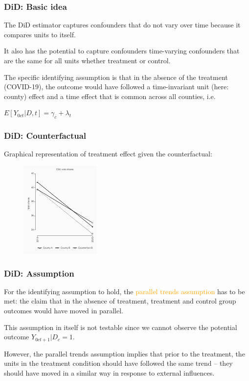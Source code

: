 \documentclass[12pt,english,dvipsnames,aspectratio=169,handout]{beamer}\usepackage[]{graphicx}\usepackage[]{xcolor}
\begin{document}
\begin{frame}
  \frametitle{DiD: Basic idea}
\footnotesize

The DiD estimator captures confounders that do not vary over time because it compares units to itself.

It also has the potential to capture confounders time-varying confounders that are the same for all units whether treatment or control. 

The specific identifying assumption is that in the absence of the treatment (COVID-19), the outcome would have followed a time-invariant unit (here: county) effect and a time effect that is common across all counties, i.e.\

$E[Y_{0ct}|D,t] = \gamma_c + \lambda_t$

\end{frame}


\begin{frame}
  \frametitle{DiD: Counterfactual}
\footnotesize

Graphical representation of treatment effect given the counterfactual:

	 \begin{figure} 
    \includegraphics[height=.7\textheight,keepaspectratio=true]{../04-figures/08/01-twoperiod.pdf}
    \end{figure}

\end{frame}



\begin{frame}
  \frametitle{DiD: Assumption}
\footnotesize

For the identifying assumption to hold, the \textcolor{orange}{parallel trends assumption} has to be met: the claim that in the absence of treatment, treatment and control group outcomes would have moved in parallel.

This assumption in itself is not testable since we cannot observe the potential outcome $Y_{0ct+1}|D_c=1$.

However, the parallel trends assumption implies that prior to the treatment, the units in the treatment condition should have followed the same trend -- they should have moved in a similar way in response to external influences. 

\end{frame}
\end{document}
